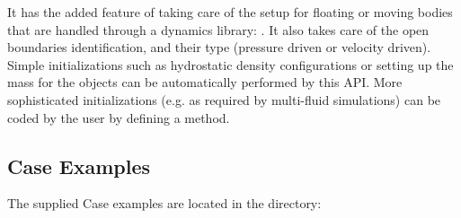 \documentclass{../GPUSPHtemplate}
\begin{document}
It has the added feature of taking care of the setup for floating or
moving bodies that are handled through a dynamics library:  .  It also takes care of the open boundaries identification, and
their type (pressure driven or velocity driven). Simple initializations
such as hydrostatic density configurations or setting up the mass for
the objects can be automatically
performed by this API. More sophisticated initializations (e.g. as
required by multi-fluid simulations) can be coded by the user by
defining a  method.

\subsection{Case Examples}

The supplied Case examples are located in the  directory:
\end{document}
